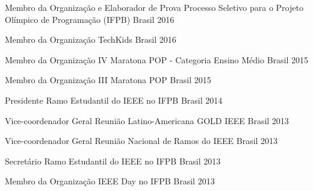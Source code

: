 \begin{cvhonors}
  
  \cvhonor
    {Membro da Organização e Elaborador de Prova} %
    {Processo Seletivo para o Projeto Olímpico de Programação (IFPB)} %
    {Brasil} %
    {2016} %
  
  \cvhonor
    {Membro da Organização} %
    {TechKids} %
    {Brasil} %
    {2016} %
  
  \cvhonor
    {Membro da Organização} %
    {IV Maratona POP - Categoria Ensino Médio} %
    {Brasil} %
    {2015} %
  
  \cvhonor
    {Membro da Organização} %
    {III Maratona POP} %
    {Brasil} %
    {2015} %
  
  \cvhonor
    {Presidente} %
    {Ramo Estudantil do IEEE no IFPB} %
    {Brasil} %
    {2014} %
  
  \cvhonor
    {Vice-coordenador Geral} %
    {Reunião Latino-Americana GOLD IEEE} %
    {Brasil} %
    {2013} %
  
  \cvhonor
    {Vice-coordenador Geral} %
    {Reunião Nacional de Ramos do IEEE} %
    {Brasil} %
    {2013} %
  
  \cvhonor
    {Secretário} %
    {Ramo Estudantil do IEEE no IFPB} %
    {Brasil} %
    {2013} %

\cvhonor
    {Membro da Organização} %
    {IEEE Day no IFPB} %
    {Brasil} %
    {2013} %

\end{cvhonors}
